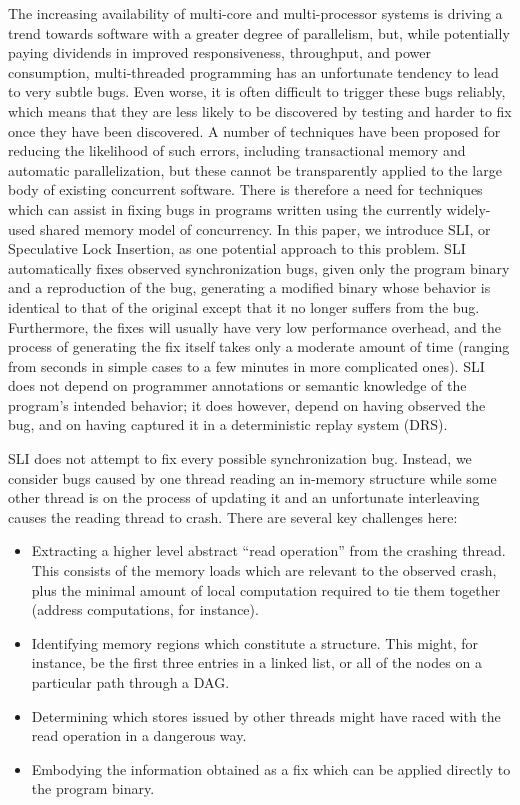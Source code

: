 \documentclass[10pt,letter,twocolumn]{sigplanconf}
\begin{document}
The increasing availability of multi-core and multi-processor systems
is driving a trend towards software with a greater degree of
parallelism, but, while potentially paying dividends in improved
responsiveness, throughput, and power consumption, multi-threaded
programming has an unfortunate tendency to lead to very subtle bugs.
Even worse, it is often difficult to trigger these bugs reliably,
which means that they are less likely to be discovered by testing and
harder to fix once they have been discovered.  A number of techniques
have been proposed for reducing the likelihood of such errors,
including transactional memory\cite{Shavit1997} and automatic
parallelization\cite{Bacon1994}, but these cannot be transparently
applied to the large body of existing concurrent software.  There is
therefore a need for techniques which can assist in fixing bugs in
programs written using the currently widely-used shared memory model
of concurrency.  In this paper, we introduce SLI, or Speculative Lock
Insertion, as one potential approach to this problem.  SLI
automatically fixes observed synchronization bugs, given only the
program binary and a reproduction of the bug, generating a modified
binary whose behavior is identical to that of the original except that
it no longer suffers from the bug.  Furthermore, the fixes will
usually have very low performance overhead, and the process of
generating the fix itself takes only a moderate amount of time
(ranging from seconds in simple cases to a few minutes in more
complicated ones).  SLI does not depend on programmer annotations or
semantic knowledge of the program's intended behavior; it does
however, depend on having observed the bug, and on having captured it
in a deterministic replay system (DRS).

SLI does not attempt to fix every possible synchronization bug.
Instead, we consider bugs caused by one thread reading an in-memory
structure while some other thread is on the process of updating it and
an unfortunate interleaving causes the reading thread to crash.  There
are several key challenges here:

\begin{itemize}
\item Extracting a higher level abstract ``read operation'' from the
  crashing thread.  This consists of the memory loads which are
  relevant to the observed crash, plus the minimal amount of local
  computation required to tie them together (address computations, for
  instance).

\item Identifying memory regions which constitute a structure.  This
  might, for instance, be the first three entries in a linked list, or
  all of the nodes on a particular path through a
  DAG.

\item Determining which stores issued by other threads might have
  raced with the read operation in a dangerous way.

\item Embodying the information obtained as a fix which can be applied
  directly to the program binary.
\end{itemize}
\end{document}
